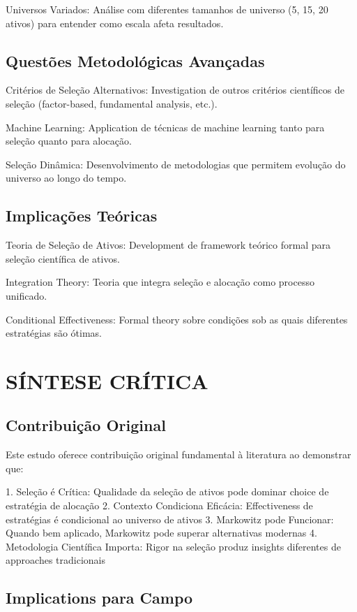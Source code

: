 Universos Variados: Análise com diferentes tamanhos de universo (5, 15, 20 ativos) para entender como escala afeta resultados.

\subsection{Questões Metodológicas Avançadas}

Critérios de Seleção Alternativos: Investigation de outros critérios científicos de seleção (factor-based, fundamental analysis, etc.).

Machine Learning: Application de técnicas de machine learning tanto para seleção quanto para alocação.

Seleção Dinâmica: Desenvolvimento de metodologias que permitem evolução do universo ao longo do tempo.

\subsection{Implicações Teóricas}

Teoria de Seleção de Ativos: Development de framework teórico formal para seleção científica de ativos.

Integration Theory: Teoria que integra seleção e alocação como processo unificado.

Conditional Effectiveness: Formal theory sobre condições sob as quais diferentes estratégias são ótimas.

\section{SÍNTESE CRÍTICA}

\subsection{Contribuição Original}

Este estudo oferece contribuição original fundamental à literatura ao demonstrar que:

1. Seleção é Crítica: Qualidade da seleção de ativos pode dominar choice de estratégia de alocação
2. Contexto Condiciona Eficácia: Effectiveness de estratégias é condicional ao universo de ativos
3. Markowitz pode Funcionar: Quando bem aplicado, Markowitz pode superar alternativas modernas
4. Metodologia Científica Importa: Rigor na seleção produz insights diferentes de approaches tradicionais

\subsection{Implications para Campo}

